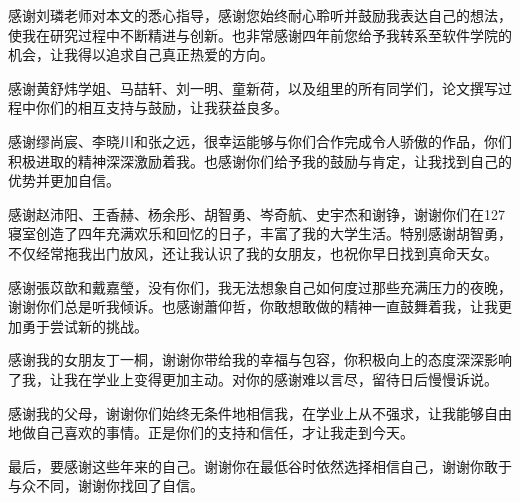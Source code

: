 
\begin{acknowledgements}
  
  感谢刘璘老师对本文的悉心指导，感谢您始终耐心聆听并鼓励我表达自己的想法，使我在研究过程中不断精进与创新。也非常感谢四年前您给予我转系至软件学院的机会，让我得以追求自己真正热爱的方向。

  感谢黄舒炜学姐、马喆轩、刘一明、童新荷，以及组里的所有同学们，论文撰写过程中你们的相互支持与鼓励，让我获益良多。
  
  感谢缪尚宸、李晓川和张之远，很幸运能够与你们合作完成令人骄傲的作品，你们积极进取的精神深深激励着我。也感谢你们给予我的鼓励与肯定，让我找到自己的优势并更加自信。
  
  感谢赵沛阳、王香赫、杨余彤、胡智勇、岑奇航、史宇杰和谢铮，谢谢你们在127寝室创造了四年充满欢乐和回忆的日子，丰富了我的大学生活。特别感谢胡智勇，不仅经常拖我出门放风，还让我认识了我的女朋友，也祝你早日找到真命天女。
  
  感谢張苡歆和戴嘉瑩，没有你们，我无法想象自己如何度过那些充满压力的夜晚，谢谢你们总是听我倾诉。也感谢蕭仰哲，你敢想敢做的精神一直鼓舞着我，让我更加勇于尝试新的挑战。
  
  感谢我的女朋友丁一桐，谢谢你带给我的幸福与包容，你积极向上的态度深深影响了我，让我在学业上变得更加主动。对你的感谢难以言尽，留待日后慢慢诉说。
  
  感谢我的父母，谢谢你们始终无条件地相信我，在学业上从不强求，让我能够自由地做自己喜欢的事情。正是你们的支持和信任，才让我走到今天。
  
  最后，要感谢这些年来的自己。谢谢你在最低谷时依然选择相信自己，谢谢你敢于与众不同，谢谢你找回了自信。

\end{acknowledgements}
